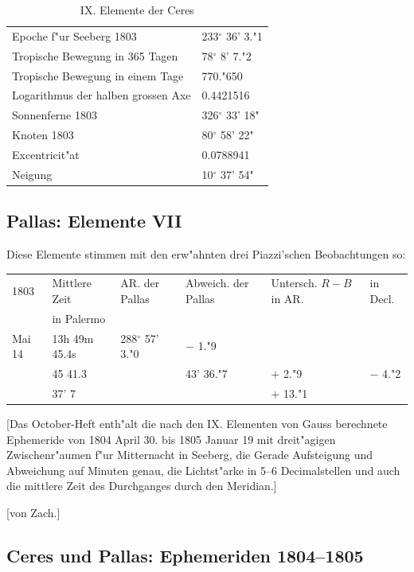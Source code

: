 \documentclass[12pt,a4paper]{article}
\begin{document}
\begin{table}[H]
\centering
\begin{tabular}{l l}
\toprule
Epoche f"ur Seeberg 1803 & 233$^\circ$ 36' 3."1 \\
Tropische Bewegung in 365 Tagen & 78$^\circ$ 8' 7."2 \\
Tropische Bewegung in einem Tage & 770."650 \\
Logarithmus der halben grossen Axe & 0.4421516 \\
Sonnenferne 1803 & 326$^\circ$ 33' 18" \\
Knoten 1803 & 80$^\circ$ 58' 22" \\
Excentricit"at & 0.0788941 \\
Neigung & 10$^\circ$ 37' 54" \\
\bottomrule
\end{tabular}
\caption{IX. Elemente der Ceres}
\end{table}

\subsection{Pallas: Elemente VII}

Diese Elemente stimmen mit den erw"ahnten drei Piazzi'schen Beobachtungen so:

\begin{table}[H]
\centering
\begin{tabular}{l l l l l l}
\toprule
1803 & Mittlere Zeit & AR. der Pallas & Abweich. der Pallas & Untersch. $R-B$ in AR. & in Decl. \\
& in Palermo & & & & \\
\midrule
Mai 14 & 13h 49m 45.4s & 288$^\circ$ 57' 3."0 & $-$ 1."9 & & \\
& 45 41.3 & & 43' 36."7 & $+$ 2."9 & $-$ 4."2 \\
& 37' 7 & & & $+$ 13."1 & \\
\bottomrule
\end{tabular}
\end{table}

[Das October-Heft enth"alt die nach den IX. Elementen von Gauss berechnete Ephemeride von 1804 April 30. bis 1805 Januar 19 mit dreit"agigen Zwischenr"aumen f"ur Mitternacht in Seeberg, die Gerade Aufsteigung und Abweichung auf Minuten genau, die Lichtst"arke in 5--6 Decimalstellen und auch die mittlere Zeit des Durchganges durch den Meridian.]

[von Zach.]

\subsection{Ceres und Pallas: Ephemeriden 1804--1805}
\end{document}
